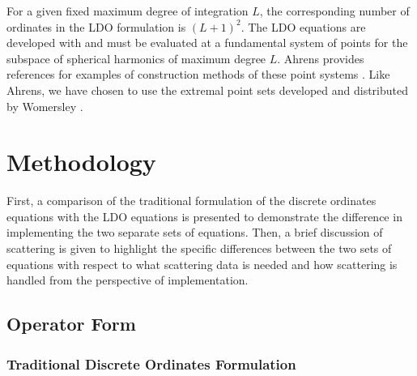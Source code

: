 \documentclass{article} %
\begin{document}
For a given fixed maximum degree of integration $L$, the corresponding number
of ordinates in the LDO formulation is $(L+1)^2$. The LDO equations are
developed with and must be evaluated at a fundamental system of points for the
subspace of spherical harmonics of maximum degree $L$. Ahrens provides references
for examples of construction methods of these point systems \cite{ahrens}. Like Ahrens, we
have chosen to use the extremal point sets developed and distributed by
Womersley \cite{wom}.

\section{Methodology}

First, a comparison of the traditional formulation of the discrete ordinates
equations with the LDO equations is presented to demonstrate the difference
in implementing the two separate sets of equations. Then, a brief discussion
of  scattering is given to highlight the specific differences between the two
sets of equations with respect to what scattering data is needed and how
scattering is handled from the perspective of implementation.

\subsection{Operator Form}
\subsubsection{Traditional Discrete Ordinates Formulation}
\end{document}
